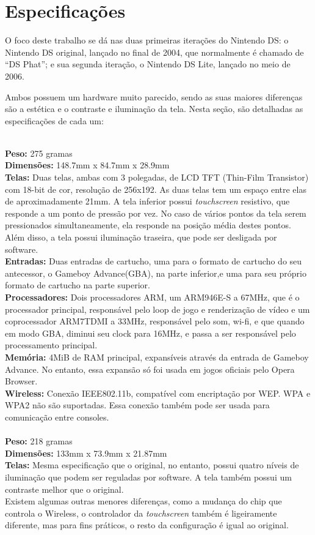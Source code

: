 \documentclass[brazil]{abnt}
\begin{document}
\section{Especificações}

O foco deste trabalho se dá nas duas primeiras iterações do Nintendo DS: o Nintendo DS original, lançado no final de 2004, que normalmente é chamado de ``DS Phat''; e sua segunda iteração, o Nintendo DS Lite, lançado no meio de 2006.

Ambos possuem um hardware muito parecido, sendo as suas maiores diferenças são a estética e o contraste e iluminação da tela. Nesta seção, são detalhadas as especificações de cada um:

\\
{\bf Peso:} 275 gramas\\
{\bf Dimensões:} 148.7mm x 84.7mm x 28.9mm\\
{\bf Telas:} Duas telas, ambas com 3 polegadas, de LCD TFT (Thin-Film Transistor) com 18-bit de cor, resolução de 256x192. As duas telas tem um espaço entre elas de aproximadamente 21mm. A tela inferior possui \textit{touchscreen} resistivo, que responde a um ponto de pressão por vez. No caso de vários pontos da tela serem pressionados simultaneamente, ela responde na posição média destes pontos.\\
Além disso, a tela possui iluminação traseira, que pode ser desligada por software.\\
{\bf Entradas:} Duas entradas de cartucho, uma para o formato de cartucho do seu antecessor, o Gameboy Advance(GBA), na parte inferior,e uma para seu próprio formato de cartucho na parte superior.\\
{\bf Processadores:} Dois processadores ARM, um ARM946E-S a 67MHz, que é o processador principal, responsável pelo loop de jogo e renderização de vídeo e um coprocessador ARM7TDMI a 33MHz, responsável pelo som, wi-fi, e que quando em modo GBA, diminui seu clock para 16MHz, e passa a ser responsável pelo processamento principal.\\
{\bf Memória:} 4MiB de RAM principal, expansíveis através da entrada de Gameboy Advance. No entanto, essa expansão só foi usada em jogos oficiais pelo Opera Browser.\\
{\bf Wireless:} Conexão IEEE802.11b, compatível com encriptação por WEP. WPA e WPA2 não são suportadas. Essa conexão também pode ser usada para comunicação entre consoles.\\

\\
{\bf Peso:} 218 gramas\\
{\bf Dimensões:} 133mm x 73.9mm x 21.87mm\\
{\bf Telas:} Mesma especificação que o original, no entanto, possui quatro níveis de iluminação que podem ser reguladas por software. A tela também possui um contraste melhor que o original.\\
Existem algumas outras menores diferenças, como a mudança do chip que controla o Wireless, o controlador da \textit{touchscreen} também é ligeiramente diferente, mas para fins práticos, o resto da configuração é igual ao original.
\end{document}
